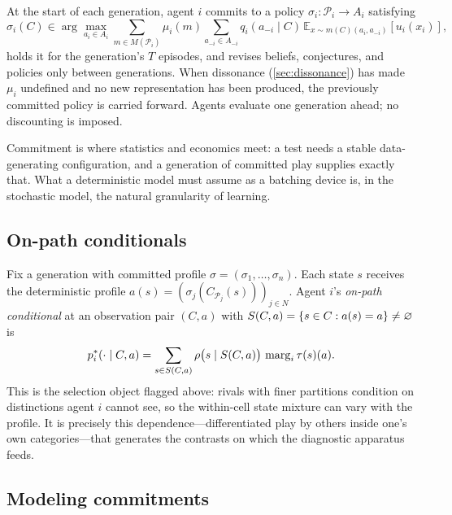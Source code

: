 \begin{assumption}
\label{ass:commitment}
At the start of each generation, agent $i$ commits to a policy
$\sigma_i:\mathcal P_i\to A_i$ satisfying
\begin{equation}
\sigma_i(C)\in\arg\max_{a_i\in A_i}
\sum_{m\in M(\mathcal P_i)}\mu_i(m)
\sum_{a_{-i}\in A_{-i}}q_i(a_{-i}\mid C)\,
\mathbb E_{x\sim m(C)(a_i,a_{-i})}\!\left[u_i(x_i)\right],
\label{eq:subjective-optimality}
\end{equation}
holds it for the generation's $T$ episodes, and revises beliefs, conjectures,
and policies only between generations.  When dissonance
(\cref{sec:dissonance}) has made $\mu_i$ undefined and no new representation
has been produced, the previously committed policy is carried forward.
Agents evaluate one generation ahead; no discounting is imposed.
\end{assumption}

Commitment is where statistics and economics meet: a test needs a stable
data-generating configuration, and a generation of committed play supplies
exactly that.  What a deterministic model must assume as a batching device
is, in the stochastic model, the natural granularity of learning.

\subsection{On-path conditionals}

Fix a generation with committed profile $\sigma=(\sigma_1,\dots,\sigma_n)$.
Each state $s$ receives the deterministic profile
$a(s)=(\sigma_j(C_{\mathcal P_j}(s)))_{j\in N}$.  Agent $i$'s \emph{on-path
conditional} at an observation pair $(C,a)$ with
$S(C,a)=\{s\in C:a(s)=a\}\neq\varnothing$ is
\begin{equation}
p_i^{*}(\cdot\mid C,a)
=
\sum_{s\in S(C,a)}\rho\bigl(s\mid S(C,a)\bigr)\,\operatorname{marg}_{i}\tau(s)(a).
\label{eq:onpath-conditional}
\end{equation}
This is the selection object flagged above: rivals with finer partitions
condition on distinctions agent $i$ cannot see, so the within-cell state
mixture can vary with the profile.  It is precisely this
dependence---differentiated play by others inside one's own
categories---that generates the contrasts on which the diagnostic apparatus
feeds.

\subsection{Modeling commitments}
\label{sec:commitments}


